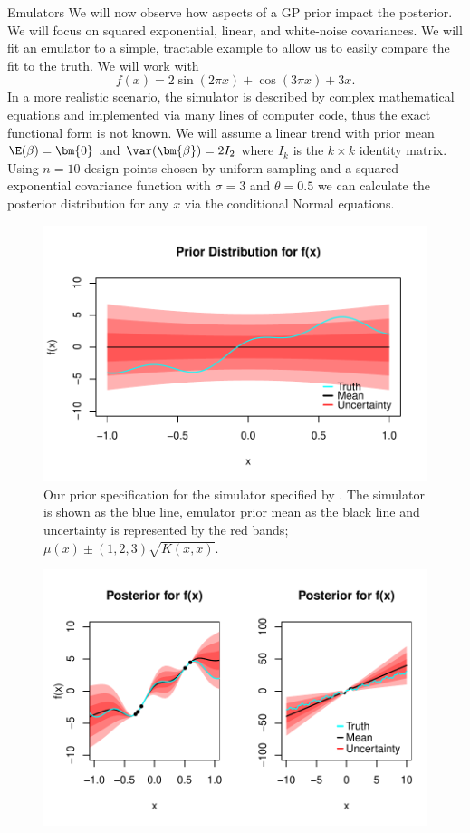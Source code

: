 \begin{chapter}{Emulators \label{Ch:Emulators}}
 We will now observe how aspects of a GP prior impact the posterior. We will focus on squared exponential, linear, and white-noise covariances. We will fit an emulator to a simple, tractable example to allow us to easily compare the fit to the truth. We will work with
 \begin{equation}
   f(x) = 2 \sin (2 \pi x) + \cos(3\pi x) + 3x. \label{Eq:toy-fn}
 \end{equation}
In a more realistic scenario, the simulator is described by complex mathematical equations and implemented via many lines of computer code, thus the exact functional form is not known. We will assume a linear trend with prior mean $\E (\beta) = \bm{0}$ and $\var(\bm{\beta}) = 2I_2$ where $I_k$ is the $k \times k$ identity matrix. Using $n = 10$ design points chosen by uniform sampling and a squared exponential covariance function with $\sigma = 3$ and $\theta = 0.5$ we can calculate the posterior distribution for any $x$ via the conditional Normal equations.
\begin{figure}[h]
  \centering
  \includegraphics{fig-emulators/prior.pdf}
  \caption{Our prior specification for the simulator specified by . The simulator is shown as the blue line, emulator prior mean as the black line and uncertainty is represented by the red bands; $\mu(x) \pm (1,2,3)\sqrt{K(x,x)}$.}
  \label{Fig:prior}
\end{figure}
\begin{figure}[h]
  \centering
  \includegraphics{fig-emulators/dual-posterior.pdf}

\end{figure}
\end{chapter}
